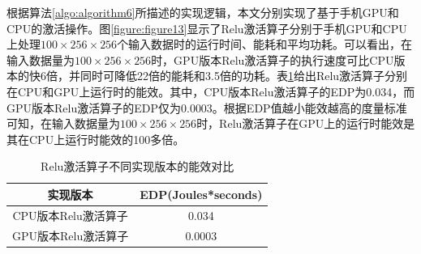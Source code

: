 根据算法\ref{algo:algorithm6}所描述的实现逻辑，本文分别实现了基于手机GPU和CPU的激活操作。图\ref{figure:figure13}显示了Relu激活算子分别于手机GPU和CPU上处理$100 \times 256 \times 256 $个输入数据时的运行时间、能耗和平均功耗。可以看出，在输入数据量为$100 \times 256 \times 256 $时，GPU版本Relu激活算子的执行速度可比CPU版本的快6倍，并同时可降低22倍的能耗和3.5倍的功耗。表\ref{table:table4}给出Relu激活算子分别在CPU和GPU上运行时的能效。其中，CPU版本Relu激活算子的EDP为0.034，而GPU版本Relu激活算子的EDP仅为0.0003。根据EDP值越小能效越高的度量标准可知，在输入数据量为$100 \times 256 \times 256 $时，Relu激活算子在GPU上的运行时能效是其在CPU上运行时能效的100多倍。

\begin{table}[htbp]
  \centering
  \caption{Relu激活算子不同实现版本的能效对比}
  \label{table:table4}
  \begin{tabular}{cc}
    \toprule
      实现版本 & EDP(Joules*seconds) \\
    \midrule
      CPU版本Relu激活算子 & 0.034 \\
      GPU版本Relu激活算子 & 0.0003 \\
    \bottomrule
  \end{tabular}
\end{table}


